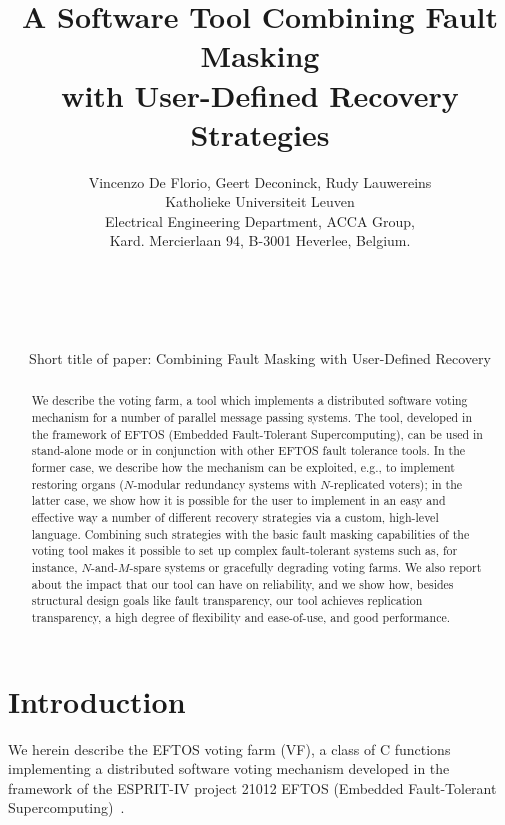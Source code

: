 \documentclass[11pt]{article}
\begin{document}
\title{A Software Tool Combining Fault Masking \\
with User-Defined Recovery Strategies}
\author{Vincenzo De Florio, Geert Deconinck, Rudy Lauwereins \\
Katholieke Universiteit Leuven\\
Electrical Engineering Department, ACCA Group,\\
Kard. Mercierlaan 94, B-3001 Heverlee, Belgium.\\
\\ \\ \\ \\ \\ 
Short title of paper: Combining Fault Masking with User-Defined Recovery}
\def\today{}
\maketitle
\vfill\eject
\begin{abstract}
We describe the voting farm, a tool which implements a distributed software
voting mechanism for a number of parallel message passing systems.
The tool, developed in the framework of EFTOS
(Embedded Fault-Tolerant Supercomputing), can be used in stand-alone mode or
in conjunction with other EFTOS fault tolerance tools.
In the former case, we describe how the mechanism can be exploited, e.g.,
to implement restoring organs ($N\!$-modular redundancy systems with 
$N\!$-replicated voters); in the latter case, we show how it is possible 
for the user to implement in an easy and effective way a number of
different recovery strategies via a custom, high-level language. Combining
such strategies with the basic fault
masking capabilities of the voting tool makes it possible to set up complex fault-tolerant
systems such as, for instance, $N\!$-and-$M\!$-spare systems or gracefully degrading
voting farms. 
We also report about the impact that our tool can have on reliability, and
we show how,
besides structural design goals like
fault transparency, our tool achieves replication transparency, a high
degree of flexibility and ease-of-use, and good performance. 
\end{abstract}
\vfill\eject

\section{Introduction}
We herein describe the EFTOS voting farm (VF),
a class of C functions implementing a distributed software voting mechanism
developed in the framework of the ESPRIT-IV project 21012 EFTOS
(Embedded Fault-Tolerant Supercomputing)~\cite{DDLV97a,DVBD97}.
\end{document}
